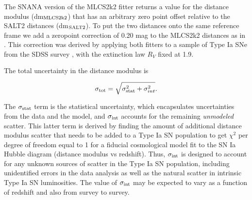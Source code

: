 \documentclass[iop]{emulateapj}
\def\P14{\citetalias{Patel:2014}}
\begin{document}
The SNANA version of the MLCS2k2 fitter returns a value for the
distance modulus (dm$_{\rm MLCS2k2}$) that has an arbitrary zero point
offset relative to the SALT2 distances (dm$_{\rm SALT2}$).  To put the
two distances onto the same reference frame we add a zeropoint
correction of 0.20 mag to the MLCS2k2 distances as
in \P14.  This correction was derived by applying both
fitters to a sample of Type Ia SNe from the SDSS
survey \citep{Holtzman:2008,Kessler:2009b}, with the extinction law
$R_V$ fixed at 1.9.

The total uncertainty in the distance modulus is  

\begin{equation} \label{eqn:sigmatot}
 \sigma_{\rm tot} = \sqrt{ \sigma_{\rm stat}^2 + \sigma_{int}^2}.
\end{equation}

\noindent
The $\sigma_{\rm stat}$ term is the statistical uncertainty, which
encapsulates uncertainties from the data and the model, and
$\sigma_{\rm int}$ accounts for the remaining {\it unmodeled} scatter.
This latter term is derived by finding the amount of additional
distance modulus scatter that needs to be added to a Type Ia SN
population to get $\chi^2$ per degree of freedom equal to 1 for a
fiducial cosmological model fit to the SN Ia Hubble diagram (distance
modulus vs redshift).  Thus, $\sigma_{\rm int}$ is designed to account
for any unknown sources of scatter in the Type Ia SN population,
including unidentified errors in the data analysis as well as the
natural scatter in intrinsic Type Ia SN luminosities.  The value of
$\sigma_{\rm int}$ may be expected to vary as a function of redshift
and also from survey to survey.
\end{document}
